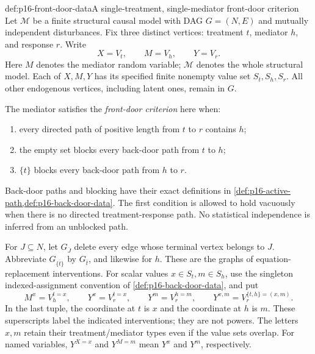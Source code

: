 \begin{hbdefinition}{def:p16-front-door-data}{A single-treatment, single-mediator front-door criterion}
Let \(\mathcal M\) be a finite structural causal model with DAG
\(G=(N,E)\) and mutually independent disturbances. Fix three
distinct vertices: treatment \(t\), mediator \(h\), and response
\(r\). Write
\[
 X=V_t,\qquad M=V_h,\qquad Y=V_r.
\]
Here \(M\) denotes the mediator random variable; \(\mathcal M\)
denotes the whole structural model. Each of \(X,M,Y\) has its
specified finite nonempty value set \(S_t,S_h,S_r\).
All other endogenous vertices, including latent ones, remain in \(G\).

The mediator satisfies the \emph{front-door criterion} here when:
\begin{enumerate}
\item every directed path of positive length from \(t\) to \(r\)
      contains \(h\);
\item the empty set blocks every back-door path from \(t\) to \(h\);
\item \(\{t\}\) blocks every back-door path from \(h\) to \(r\).
\end{enumerate}
Back-door paths and blocking have their exact definitions in
\cref{def:p16-active-path,def:p16-back-door-data}. The first condition
is allowed to hold vacuously when there is no directed treatment-response
path. No statistical independence is inferred from an unblocked path.

For \(J\subseteq N\), let \(G_{\overline J}\) delete every
edge whose terminal vertex belongs to \(J\). Abbreviate
\(G_{\overline{\{t\}}}\) by \(G_{\overline t}\), and likewise
for \(h\). These are the graphs of equation-replacement interventions.
For scalar values \(x\in S_t,m\in S_h\), use the singleton
indexed-assignment convention of \cref{def:p16-back-door-data}, and put
\[
 M^x=V_h^{t=x},\qquad Y^x=V_r^{t=x},\qquad
 Y^m=V_r^{h=m},\qquad Y^{x,m}=V_r^{\{t,h\}=(x,m)}.
\]
In the last tuple, the coordinate at \(t\) is \(x\) and the
coordinate at \(h\) is \(m\). These superscripts label the
indicated interventions; they are not powers. The letters \(x,m\)
retain their treatment/mediator types even if the value sets overlap.
For named variables, \(Y^{X=x}\) and \(Y^{M=m}\) mean
\(Y^x\) and \(Y^m\), respectively.
\end{hbdefinition}

